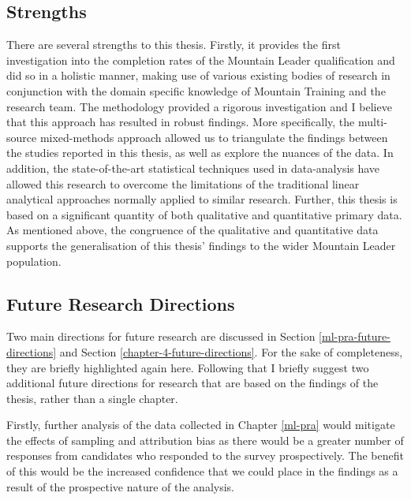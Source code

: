 \documentclass[
  12pt,
  a4paper,
]{book}
\begin{document}
\hypertarget{general-discussion-strengths}{%
\subsection{Strengths}\label{general-discussion-strengths}}

There are several strengths to this thesis. Firstly, it provides the first investigation into the completion rates of the Mountain Leader qualification and did so in a holistic manner, making use of various existing bodies of research in conjunction with the domain specific knowledge of Mountain Training and the research team. The methodology provided a rigorous investigation and I believe that this approach has resulted in robust findings. More specifically, the multi-source mixed-methods approach allowed us to triangulate the findings between the studies reported in this thesis, as well as explore the nuances of the data. In addition, the state-of-the-art statistical techniques used in data-analysis have allowed this research to overcome the limitations of the traditional linear analytical approaches normally applied to similar research. Further, this thesis is based on a significant quantity of both qualitative and quantitative primary data. As mentioned above, the congruence of the qualitative and quantitative data supports the generalisation of this thesis' findings to the wider Mountain Leader population.

\hypertarget{future-research-directions}{%
\subsection{Future Research Directions}\label{future-research-directions}}

Two main directions for future research are discussed in Section \ref{ml-pra-future-directions} and Section \ref{chapter-4-future-directions}. For the sake of completeness, they are briefly highlighted again here. Following that I briefly suggest two additional future directions for research that are based on the findings of the thesis, rather than a single chapter.

Firstly, further analysis of the data collected in Chapter \ref{ml-pra} would mitigate the effects of sampling and attribution bias as there would be a greater number of responses from candidates who responded to the survey prospectively. The benefit of this would be the increased confidence that we could place in the findings as a result of the prospective nature of the analysis.
\end{document}
